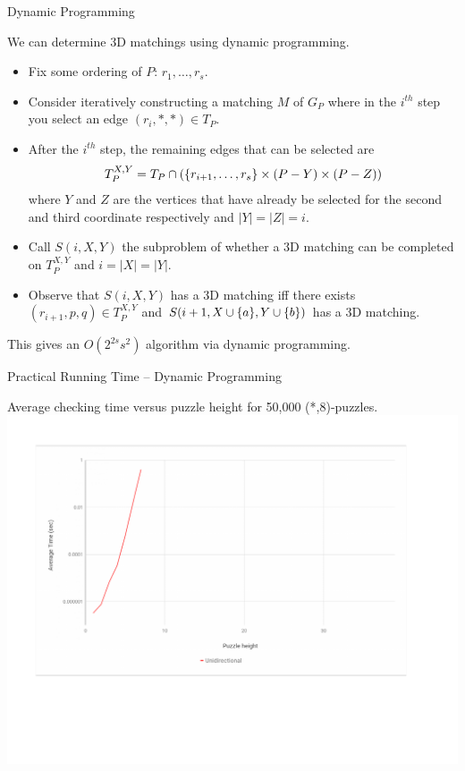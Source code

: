 \documentclass[t,10pt,
mathserif,xcolor=dvipsnames]{beamer}
\begin{document}
\begin{myframe}{Dynamic Programming}

  We can determine 3D matchings using dynamic programming.

  \begin{itemize}
  \item Fix some ordering of $P$: $r_1,\ldots,r_s$.
  \item Consider iteratively constructing a matching $M$ of $G_P$
    where in the $i^{th}$ step you select an edge $(r_i,*,*) \in T_P$.
  \item After the $i^{th}$ step, the remaining edges that can be
    selected are $$T_P^{X,Y} = T_P \cap (\{{r_{i+1},\ldots,r_s}\} \times (P - Y)
    \times (P - Z))$$ where $Y$ and $Z$ are the vertices that have
    already be selected for the second and third coordinate
    respectively and $|Y| = |Z| = i$.
  \item Call $S(i, X, Y)$ the subproblem of whether a 3D matching can be
    completed on $T_P^{X,Y}$ and $i = |X| = |Y|$.
  \item Observe that $S(i,X,Y)$ has a 3D matching iff there exists
    $(r_{i+1},p,q) \in T_P^{X,Y}$ and $S(i+1, X \cup \{{a}\},Y \cup
    \{{b}\})$ has a 3D matching.
  \end{itemize}
  This gives an $O(2^{2s} s^2)$ algorithm via dynamic programming.
  
\end{myframe}

\begin{myframe}{Practical Running Time -- Dynamic Programming}

  Average checking time versus puzzle height for 50,000 (*,8)-puzzles.
  \hspace*{-9ex}\includegraphics[width=1.28\linewidth, trim={.5in 2in 1in 1in}, clip]{figs/plotuni.pdf}
 
\end{myframe}
\end{document}
